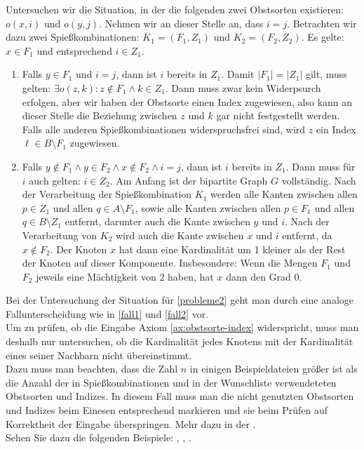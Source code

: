 Untersuchen wir die Situation, in der die folgenden 
zwei Obstsorten existieren: $o(x, i)$ und $o(y, j)$.
Nehmen wir an dieser Stelle an, dass $i=j$.
Betrachten wir dazu zwei Spießkombinationen: $K_1 = (F_1, Z_1)$ und $K_2 = (F_2, Z_2)$.
Es gelte: $x \in F_1$ und entsprechend $i \in Z_1$.
\begin{enumerate}[label={\upshape(F\arabic*)}]
  \item Falls $y \in F_1$ und $i = j$, dann ist $i$ bereits in $Z_1$. Damit $|F_1| = |Z_1|$ gilt,
  muss gelten: $\exists o(z, k) : z \notin F_1 \land k \in Z_1$.
  Dann muss zwar kein Widerpsurch erfolgen, aber wir haben der Obstsorte einen Index zugewiesen,
  also kann an dieser Stelle die Beziehung zwischen $z$ und $k$ gar nicht festgestellt werden.
  Falls alle anderen Spießkombinationen widerspruchsfrei sind,
  wird $z$ ein Index $\ell \in B \setminus F_1$ zugewiesen.\label{fall1}

  \item Falls $y \notin F_1 \land y \in F_2 \land x \notin F_2 \land i =j$, dann ist $i$ bereits in $Z_1$.
  Dann muss für $i$ auch gelten: $i \in Z_2$. Am Anfang ist der bipartite Graph $G$ vollständig.
  Nach der Verarbeitung der Spießkombination $K_1$ werden alle Kanten zwischen allen
  $p \in Z_1$ und allen $q \in A \setminus F_1$, sowie alle Kanten zwischen allen
  $p \in F_1$ und allen $q \in B \setminus Z_1$ entfernt, darunter auch die Kante zwischen
  $y$ und $i$. Nach der Verarbeitung von $K_2$ wird auch die Kante zwischen $x$ und $i$
  entfernt, da $x \notin F_2$. Der Knoten $x$ hat dann eine Kardinalität um 1 kleiner
  als der Rest der Knoten auf dieser Komponente. Insbesondere: Wenn die Mengen
  $F_1$ und $F_2$ jeweils eine Mächtigkeit von 2 haben, hat $x$ dann den Grad 0.\label{fall2}
\end{enumerate}

Bei der Untersuchung der Situation für \ref{probleme2} geht man durch eine analoge Fallunterscheidung wie
in \ref{fall1} und \ref{fall2} vor.\\

Um zu prüfen, ob die Eingabe Axiom \ref{ax:obstsorte-index} widerspricht, muss man deshalb
nur untersuchen, ob die Kardinalität jedes Knotens mit der Kardinalität eines seiner 
Nachbarn nicht übereinstimmt.\\
Dazu muss man beachten, dass die Zahl $n$ in einigen Beispieldateien größer ist
als die Anzahl der in Spießkombinationen und in der Wunschliste verwendeteten Obstsorten
und Indizes. In diesem Fall muss man die nicht genutzten Obstsorten und Indizes beim Einesen
entsprechend markieren und sie beim Prüfen auf Korrektheit der Eingabe überspringen. Mehr dazu
in der .\\

Sehen Sie dazu die folgenden Beispiele: , , .


